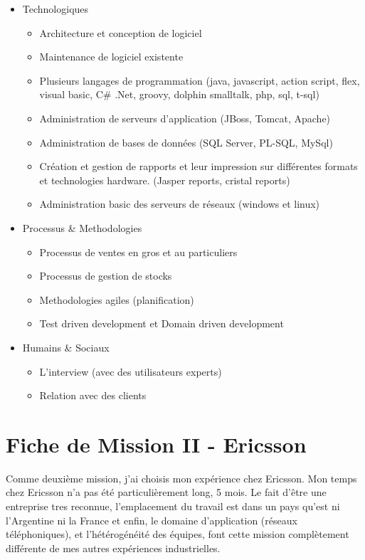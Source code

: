 \documentclass{resume} %
\begin{document}
	\begin{itemize} 				
			\item Technologiques 
					\begin{itemize}
						\item Architecture et conception de logiciel 
						\item Maintenance de logiciel existente
						\item Plusieurs langages de programmation (java, javascript, action script, flex, visual basic, C\# .Net, groovy, dolphin smalltalk, php, sql, t-sql)
						\item Administration de serveurs d'application (JBoss, Tomcat, Apache)
						\item Administration de bases de données (SQL Server, PL-SQL, MySql)
						\item Création et gestion de rapports et leur impression sur différentes formats et technologies hardware. (Jasper reports, cristal reports)
						\item Administration basic des serveurs de réseaux (windows et linux)
					\end {itemize}
			\item Processus \& Methodologies 
					\begin{itemize}
						\item Processus de ventes en gros et au particuliers 
						\item Processus de gestion de stocks 
						\item Methodologies agiles (planification) 
						\item Test driven development et Domain driven development
					\end {itemize}
			\item  Humains \& Sociaux  
				\begin{itemize}
						\item L'interview (avec des utilisateurs experts)
						\item Relation avec des clients
					\end {itemize}

		\end{itemize}
		




\section{Fiche de Mission II - Ericsson }
Comme deuxième mission, j'ai choisis mon expérience chez Ericsson.
Mon temps chez Ericsson n'a pas été particulièrement long, 5 mois. Le fait d'être une entreprise tres reconnue,  l'emplacement du travail est dans un pays qu'est ni l'Argentine ni la France et enfin,  le domaine d'application (réseaux téléphoniques), et l'hétérogénéité des équipes, font cette mission complètement différente de mes autres expériences industrielles.
\end{document}
